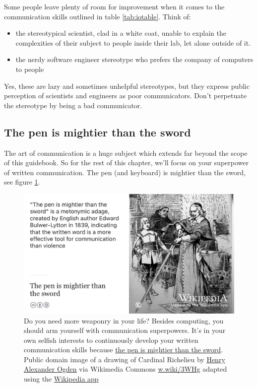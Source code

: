 \documentclass[
]{book}
\providecommand{\tightlist}{%
  \setlength{\itemsep}{0pt}\setlength{\parskip}{0pt}}
\begin{document}
Some people leave plenty of room for improvement when it comes to the communication skills outlined in table \ref{tab:iotable}. Think of:

\begin{itemize}
\tightlist
\item
  the stereotypical scientist, clad in a white coat, unable to explain the complexities of their subject to people inside their lab, let alone outside of it.
\item
  the nerdy software engineer stereotype who prefers the company of computers to people
\end{itemize}

Yes, these are lazy and sometimes unhelpful stereotypes, but they express public perception of scientists and engineers as poor communicators. Don't perpetuate the stereotype by being a bad communicator.

\hypertarget{mightier}{%
\subsection{The pen is mightier than the sword}\label{mightier}}

The art of communication is a huge subject which extends far beyond the scope of this guidebook. So for the rest of this chapter, we'll focus on your superpower of written communication. The pen (and keyboard) is mightier than the sword, see figure \ref{fig:mighty-pen-fig}.

\begin{figure}

{\centering \includegraphics[width=1\linewidth]{images/the-pen-is-mightier-than-the-sword} 

}

\caption{Do you need more weaponry in your life? Besides computing, you should arm yourself with communication superpowers. It's in your own selfish interests to continuously develop your written communication skills because \href{https://en.wikipedia.org/wiki/The_pen_is_mightier_than_the_sword}{the pen is mightier than the sword}. Public domain image of a drawing of Cardinal Richelieu by \href{https://en.wikipedia.org/wiki/Henry_Alexander_Ogden}{Henry Alexander Ogden} via Wikimedia Commons \href{https://w.wiki/3WHg}{w.wiki/3WHg} adapted using the \href{https://apps.apple.com/us/app/wikipedia/id324715238}{Wikipedia app}}\label{fig:mighty-pen-fig}
\end{figure}
\end{document}
